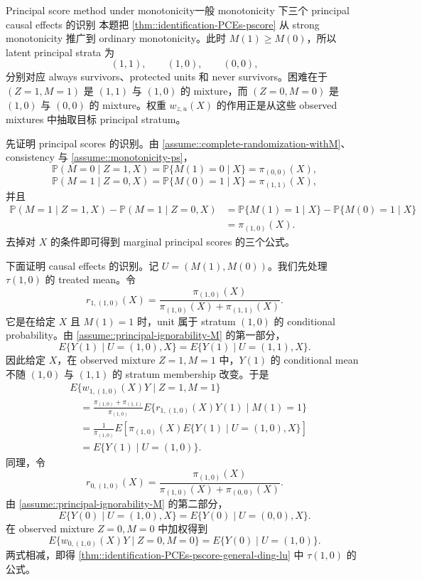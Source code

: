 \begin{exercisesolution}{Principal score method under monotonicity}{一般 monotonicity 下三个 principal causal effects 的识别}
本题把 \cref{thm::identification-PCEs-pscore} 从 strong monotonicity 推广到 ordinary monotonicity。此时 $M(1)\geq M(0)$，所以 latent principal strata 为
\[
(1,1),\qquad (1,0),\qquad (0,0),
\]
分别对应 always survivors、protected units 和 never survivors。困难在于 $(Z=1,M=1)$ 是 $(1,1)$ 与 $(1,0)$ 的 mixture，而 $(Z=0,M=0)$ 是 $(1,0)$ 与 $(0,0)$ 的 mixture。权重 $w_{z,u}(X)$ 的作用正是从这些 observed mixtures 中抽取目标 principal stratum。

先证明 principal scores 的识别。由 \cref{assume::complete-randomization-withM}、consistency 与 \cref{assume::monotonicity-ps}，
\[
\mathbb{P}(M=0\mid Z=1,X)
=\mathbb{P}\{M(1)=0\mid X\}
=\pi_{(0,0)}(X),
\]
\[
\mathbb{P}(M=1\mid Z=0,X)
=\mathbb{P}\{M(0)=1\mid X\}
=\pi_{(1,1)}(X),
\]
并且
\begin{align*}
\mathbb{P}(M=1\mid Z=1,X)-\mathbb{P}(M=1\mid Z=0,X)
&=\mathbb{P}\{M(1)=1\mid X\}-\mathbb{P}\{M(0)=1\mid X\}\\
&=\pi_{(1,0)}(X).
\end{align*}
去掉对 $X$ 的条件即可得到 marginal principal scores 的三个公式。

下面证明 causal effects 的识别。记 $U=(M(1),M(0))$。我们先处理 $\tau(1,0)$ 的 treated mean。令
\[
r_{1,(1,0)}(X)
=\frac{\pi_{(1,0)}(X)}{\pi_{(1,0)}(X)+\pi_{(1,1)}(X)}.
\]
它是在给定 $X$ 且 $M(1)=1$ 时，unit 属于 stratum $(1,0)$ 的 conditional probability。由 \cref{assume::principal-ignorability-M} 的第一部分，
\[
E\{Y(1)\mid U=(1,0),X\}
=E\{Y(1)\mid U=(1,1),X\}.
\]
因此给定 $X$，在 observed mixture $Z=1,M=1$ 中，$Y(1)$ 的 conditional mean 不随 $(1,0)$ 与 $(1,1)$ 的 stratum membership 改变。于是
\begin{align*}
&E\{w_{1,(1,0)}(X)Y\mid Z=1,M=1\}\\
&\quad =
\frac{\pi_{(1,0)}+\pi_{(1,1)}}{\pi_{(1,0)}}
E\{r_{1,(1,0)}(X)Y(1)\mid M(1)=1\}\\
&\quad =
\frac{1}{\pi_{(1,0)}}
E\left[\pi_{(1,0)}(X)E\{Y(1)\mid U=(1,0),X\}\right]\\
&\quad =
E\{Y(1)\mid U=(1,0)\}.
\end{align*}
同理，令
\[
r_{0,(1,0)}(X)
=\frac{\pi_{(1,0)}(X)}{\pi_{(1,0)}(X)+\pi_{(0,0)}(X)}.
\]
由 \cref{assume::principal-ignorability-M} 的第二部分，
\[
E\{Y(0)\mid U=(1,0),X\}
=E\{Y(0)\mid U=(0,0),X\}.
\]
在 observed mixture $Z=0,M=0$ 中加权得到
\[
E\{w_{0,(1,0)}(X)Y\mid Z=0,M=0\}
=E\{Y(0)\mid U=(1,0)\}.
\]
两式相减，即得 \cref{thm::identification-PCEs-pscore-general-ding-lu} 中 $\tau(1,0)$ 的公式。


\end{exercisesolution}
